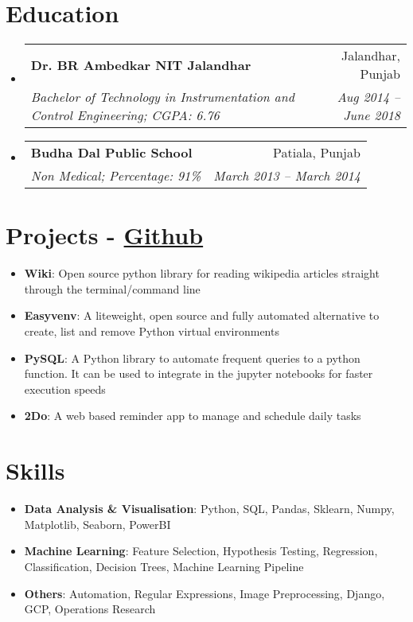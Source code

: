 \documentclass[letterpaper,11pt]{article}
\makeatletter
\newcommand{\resumeSubheading}[4]{
  \vspace{-1pt}\item
    \begin{tabular*}{0.97\textwidth}[t]{l@{\extracolsep{\fill}}r}
      \textbf{#1} & #2 \\
      \textit{\small#3} & \textit{\small #4} \\
    \end{tabular*}\vspace{-5pt}
}
\newcommand{\resumeSubHeadingListStart}{\begin{itemize}[leftmargin=*]}
\newcommand{\resumeSubHeadingListEnd}{\end{itemize}}
\makeatother
\begin{document}
\section{Education}
  \resumeSubHeadingListStart
    \resumeSubheading
      {Dr. BR Ambedkar NIT Jalandhar}{Jalandhar, Punjab}
      {Bachelor of Technology in Instrumentation and Control Engineering;  CGPA: 6.76}{Aug 2014 -- June 2018}
    \resumeSubheading
      {Budha Dal Public School}{Patiala, Punjab}
      {Non Medical; Percentage: 91\%}{March 2013 -- March 2014}
  \resumeSubHeadingListEnd

\section{Projects - \href{https://github.com/adarsh9780}{Github}}
  \resumeSubHeadingListStart
    \item{
      \textbf{Wiki}{: Open source python library for reading wikipedia articles straight through the terminal/command line}
      \hfill
    }
    \item{
      \textbf{Easyvenv}{: A liteweight, open source and fully automated alternative to create, list and remove Python virtual environments}
      \hfill
    }
    \item{
      \textbf{PySQL}{: A Python library to automate frequent queries to a python function. It can be used to integrate in the jupyter notebooks for faster execution speeds}
      \hfill
    }
    \item{
      \textbf{2Do}{: A web based reminder app to manage and schedule daily tasks}
      \hfill
    }
  \resumeSubHeadingListEnd

%
\section{Skills}
  \resumeSubHeadingListStart
    \item{
      \textbf{Data Analysis \& Visualisation}{: Python, SQL, Pandas, Sklearn, Numpy, Matplotlib, Seaborn, PowerBI}
      \hfill
    }
    \item{
      \textbf{Machine Learning}{: Feature Selection, Hypothesis Testing, Regression, Classification, Decision Trees, Machine Learning Pipeline}
      \hfill
    }
    \item{
      \textbf{Others}{: Automation, Regular Expressions, Image Preprocessing, Django, GCP, Operations Research}
      \hfill
    }
  \resumeSubHeadingListEnd
\end{document}
